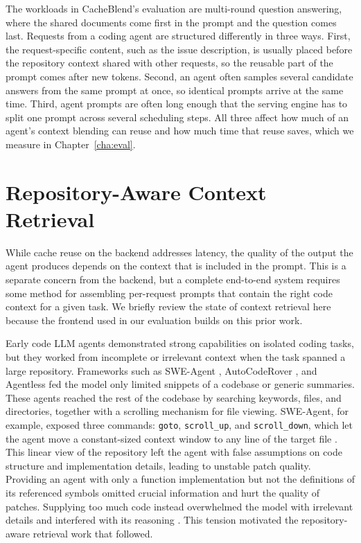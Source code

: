 The workloads in CacheBlend's evaluation are multi-round question answering, where the shared documents come first in the prompt and the question comes last. Requests from a coding agent are structured differently in three ways. First, the request-specific content, such as the issue description, is usually placed before the repository context shared with other requests, so the reusable part of the prompt comes after new tokens. Second, an agent often samples several candidate answers from the same prompt at once, so identical prompts arrive at the same time. Third, agent prompts are often long enough that the serving engine has to split one prompt across several scheduling steps. All three affect how much of an agent's context blending can reuse and how much time that reuse saves, which we measure in Chapter~\ref{cha:eval}.

\section{Repository-Aware Context Retrieval}
\label{sec:bg_context}

While cache reuse on the backend addresses latency, the quality of the output the agent produces depends on the context that is included in the prompt. This is a separate concern from the backend, but a complete end-to-end system requires some method for assembling per-request prompts that contain the right code context for a given task. We briefly review the state of context retrieval here because the frontend used in our evaluation builds on this prior work.

Early code LLM agents demonstrated strong capabilities on isolated coding tasks, but they worked from incomplete or irrelevant context when the task spanned a large repository. Frameworks such as SWE-Agent \cite{yang2024sweagent}, AutoCodeRover \cite{zhang2024autocoderover}, and Agentless \cite{xia2024agentlessdemystifyingllmbasedsoftware} fed the model only limited snippets of a codebase or generic summaries. These agents reached the rest of the codebase by searching keywords, files, and directories, together with a scrolling mechanism for file viewing. SWE-Agent, for example, exposed three commands: \verb|goto|, \verb|scroll_up|, and \verb|scroll_down|, which let the agent move a constant-sized context window to any line of the target file \cite{yang2024sweagent}. This linear view of the repository left the agent with false assumptions on code structure and implementation details, leading to unstable patch quality. Providing an agent with only a function implementation but not the definitions of its referenced symbols omitted crucial information and hurt the quality of patches. Supplying too much code instead overwhelmed the model with irrelevant details and interfered with its reasoning \cite{zhang2024hierarchicalcontextpruningoptimizing, zhang2024inftybenchextendinglongcontext}. This tension motivated the repository-aware retrieval work that followed.

